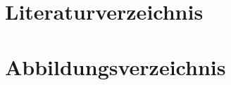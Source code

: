 \documentclass{fhnwreport}
\begin{document}


























\newpage
\section{Literaturverzeichnis}


\newpage
\section{Abbildungsverzeichnis}
\renewcommand{\listfigurename}{}
\listoffigures

\newpage
\begin{appendix}

\end{appendix}


\end{document}
